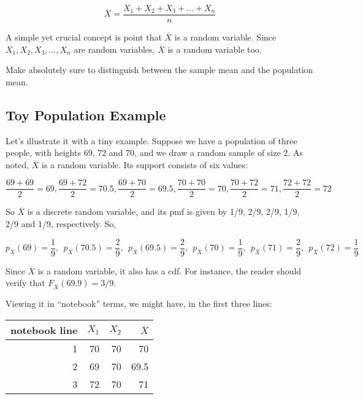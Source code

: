 \begin{equation}
\label{xbardef}
\overline{X} = \frac{X_1 + X_2 + X_3 + ... + X_n}{n}
\end{equation}

A simple yet crucial concept is point that $\overline{X}$ is a random
variable.  Since $X_1, X_2, X_3,...,X_n$ are random variables,
$\overline{X}$ is a random variable too.  

Make absolutely sure to distinguish between the sample mean and the
population mean.  

\subsection{Toy Population Example}
\label{threeyahn}

Let's illustrate it with a tiny example.  Suppose we have a population
of three people, with heights 69, 72 and 70, and we draw a random sample
of size 2.  As noted, $\overline{X}$ is a random variable.  Its support
consists of six values:

\begin{equation}
\frac{69+69}{2} = 69,
\frac{69+72}{2} = 70.5,
\frac{69+70}{2} = 69.5,
\frac{70+70}{2} = 70,
\frac{70+72}{2} = 71,
\frac{72+72}{2} = 72
\end{equation}

So $\overline{X}$ is a discrete random variable, and its pmf is given by
1/9, 2/9, 2/9, 1/9, 2/9 and 1/9, respectively.  So,

\begin{equation}
\label{pmfxbar}
p_{\overline{X}}(69) = \frac{1}{9}, ~~
p_{\overline{X}}(70.5) = \frac{2}{9}, ~~
p_{\overline{X}}(69.5) = \frac{2}{9}, ~~
p_{\overline{X}}(70) = \frac{1}{9}, ~~
p_{\overline{X}}(71) = \frac{2}{9}, ~~
p_{\overline{X}}(72) = \frac{1}{9} ~~
\end{equation}

Since $\overline{X}$ is a random variable, it also has a cdf.  For
instance, the reader should verify that $F_{\overline{X}}(69.9) = 3/9$.

Viewing it in ``notebook'' terms, we might have, in the first three
lines:

\begin{tabular}{|r|r|r|r|}
\hline
notebook line & $X_1$ & $X_2$ & $\overline{X}$  \\ \hline
\hline
1 & 70 & 70 & 70 \\ \hline
2 & 69 & 70 & 69.5 \\ \hline
3 & 72 & 70 & 71 \\ \hline
\end{tabular}

